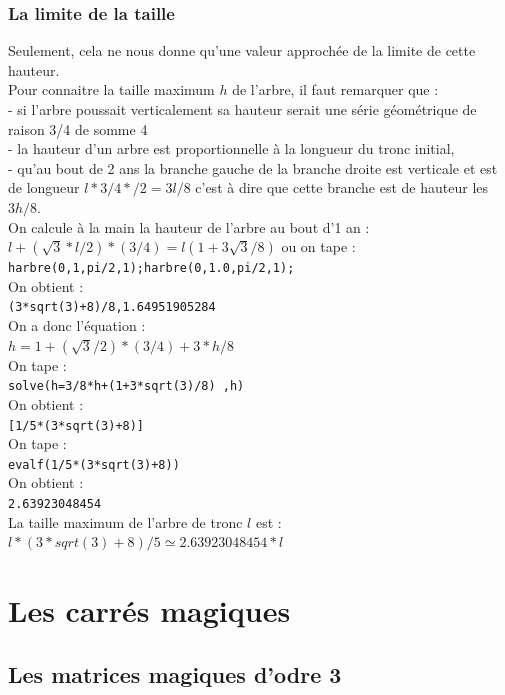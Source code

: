\documentclass[a4paper,11pt]{book}
\begin{document}
\subsection{La limite de la taille}
Seulement, cela ne nous donne qu'une valeur approch\'ee  de la limite de cette 
hauteur.\\
Pour connaitre la taille maximum $h$ de l'arbre, il faut remarquer que :\\
- si l'arbre poussait verticalement sa hauteur serait une s\'erie 
g\'eom\'etrique de raison 3/4 de somme 4 \\
- la hauteur d'un arbre est proportionnelle \`a la longueur du tronc initial,\\
- qu'au bout de 2 ans la branche gauche de la branche droite est verticale et 
est de longueur $l*3/4*/2=3l/8$ c'est \`a dire que  cette branche est de 
hauteur les $3h/8$.\\
On calcule \`a la main la hauteur de l'arbre au bout d'1 an :
$l+(\sqrt 3*l/2)*(3/4)=l(1+3\sqrt3/8)$
ou on tape :\\
{\tt harbre(0,1,pi/2,1);harbre(0,1.0,pi/2,1);}\\
On obtient :\\
{\tt (3*sqrt(3)+8)/8,1.64951905284}\\
On a donc l'\'equation :\\
$h=1+(\sqrt3/2)*(3/4)+3*h/8$ \\
On tape :\\
{\tt solve(h=3/8*h+(1+3*sqrt(3)/8) ,h)}\\
On obtient :\\
{\tt [1/5*(3*sqrt(3)+8)]}\\
On tape :\\
{\tt evalf(1/5*(3*sqrt(3)+8))}\\
On obtient :\\
{\tt 2.63923048454}\\
La taille maximum de l'arbre de tronc $l$ est :\\
$l*(3*sqrt(3)+8)/5 \simeq 2.63923048454*l$
\chapter{Les carr\'es magiques}
\section{Les matrices magiques d'odre 3}
\end{document}
